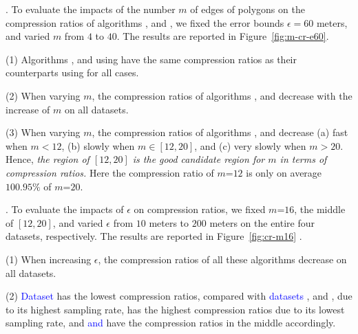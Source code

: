 .
To evaluate the impacts of the number $m$ of edges of polygons on the
compression ratios of algorithms \cisto, \cist and \cista, we fixed the error bounds {$\epsilon =60$ meters}, and varied $m$ from $4$ to $40$. The results are reported in Figure~\ref{fig:m-cr-e60}.

\ni(1) Algorithms \cisto, \cist and \cista using \rpia have the same compression ratios as their counterparts using \cpia for all cases.

\ni(2) When varying $m$, the compression ratios of algorithms
{\cisto, \cist and \cista} decrease with the increase of $m$ on all datasets.

\ni(3) When varying $m$, the compression ratios of algorithms {\cisto, \cist and \cista} decrease (a) fast when $m < 12$, (b) slowly when $m \in [12, 20]$, and (c) very slowly when $m > 20$. Hence, \emph{the region of $[12, 20]$ is the good candidate region for $m$ in terms of compression ratios.}
Here the compression ratio of $m$=$12$ is only on average {$100.95\%$} of $m$=$20$.



.
To evaluate the impacts of $\epsilon$ on compression ratios, we fixed {$m$=$16$}, the middle of $[12, 20]$, and varied $\epsilon$ from $10$ meters to $200$ meters on the entire four datasets, respectively.
The results are reported in Figure~\ref{fig:cr-m16} .


\ni (1) When increasing $\epsilon$, the compression ratios of all these algorithms decrease on all datasets.

\ni (2) \textcolor{blue}{Dataset} \pricar has the lowest compression ratios, compared with \textcolor{blue}{datasets} \mopsi, \sercar and \geolife, due to its highest sampling rate,
\textcolor{blue}{\sercar} has the highest compression ratios due to its lowest sampling rate, and \textcolor{blue}{\geolife and \mopsi} have the compression ratios in the middle accordingly.


